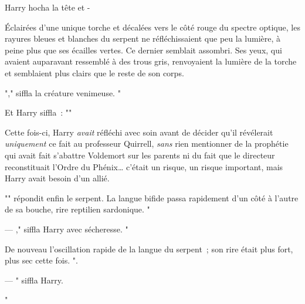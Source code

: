 Harry hocha la tête et -

Éclairées d'une unique torche et décalées vers le côté rouge du spectre optique, les rayures bleues et blanches du serpent ne réfléchissaient que peu la lumière, à peine plus que ses écailles vertes. Ce dernier semblait assombri. Ses yeux, qui avaient auparavant ressemblé à des trous gris, renvoyaient la lumière de la torche et semblaient plus clairs que le reste de son corps.

"," siffla la créature venimeuse. "

Et Harry siffla~: ""

Cette fois-ci, Harry \emph{avait} réfléchi avec soin avant de décider qu'il révélerait \emph{uniquement} ce fait au professeur Quirrell, \emph{sans} rien mentionner de la prophétie qui avait fait s'abattre Voldemort sur les parents ni du fait que le directeur reconstituait l'Ordre du Phénix… c'était un risque, un risque important, mais Harry avait besoin d'un allié.

"" répondit enfin le serpent. La langue bifide passa rapidement d'un côté à l'autre de sa bouche, rire reptilien sardonique. "

--- ," siffla Harry avec sécheresse. "

De nouveau l'oscillation rapide de la langue du serpent~; son rire était plus fort, plus sec cette fois. ".

--- " siffla Harry.

"

